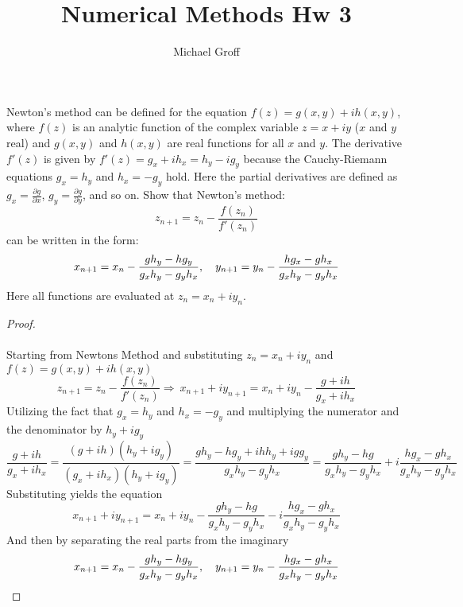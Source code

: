 \documentclass[12pt]{article}
\newenvironment{problem}[2][Problem]{\begin{trivlist}
\item[\hskip \labelsep {\bfseries #1}\hskip \labelsep {\bfseries #2.}]}{\end{trivlist}}
\begin{document}
\title{Numerical Methods Hw 3}
\author{Michael Groff 
}
\date{}
\maketitle

\begin{problem}{3.2: 40}
Newton’s method can be defined for the equation $f (z) = g(x, y)+ih(x, y)$, where $f (z)$ is an analytic function of the complex variable $z = x +iy$ ($x$ and $y$ real) and $g(x, y)$ and $h(x, y)$ are real functions for all $x$ and $y$. The derivative $f'(z)$ is given by $f'(z) = g_x +ih_x = h_y -ig_y$ because the Cauchy-Riemann equations $g_x = h_y$ and $h_x =− g_y$ hold. Here the partial derivatives are defined as $g_x = \frac{\partial g}{\partial x}$, $g_y = \frac{\partial g}{\partial y}$, and so on. Show that Newton’s method:
\[ z_{n+1} = z_n - \dfrac{f (z_n)}{ f'(z_n)}\] 
can be written in the form:
\[ x_{n+1} = x_n - \dfrac{gh_y -hg_y}{ g_xh_y -g_yh_x} , \text{  \space \space }y_{n+1} = y_n - \dfrac{hg_x -gh_x}{ g_xh_y -g_yh_x}\]
 Here all functions are evaluated at $z_n = x_n +iy_n$. 


\end{problem}

\begin{proof}
\text{ }\\
\text{ }\\
Starting from Newtons Method and substituting  $z_n = x_n +iy_n$ and $f (z) = g(x, y)+ih(x, y)$
\[ z_{n+1} = z_n − \dfrac{f (z_n)}{ f'(z_n)} \Rightarrow \ x_{n+1} + iy_{n+1} = x_n +iy_n-\dfrac{g+ih}{g_x+ih_x}\]
Utilizing the fact that  $g_x = h_y$ and $h_x =− g_y$ and multiplying the numerator and the denominator by $h_y +ig_y$
\[\dfrac{g+ih}{g_x+ih_x} = \dfrac{(g+ih)(h_y +ig_y)}{(g_x+ih_x)(h_y +ig_y)} = \dfrac{gh_y-hg_y+ihh_y+igg_y}{g_xh_y - g_yh_x} = \dfrac{gh_y-hg}{g_xh_y - g_yh_x} + i\dfrac{hg_x -gh_x}{g_xh_y - g_yh_x}\]
Substituting yields the equation
\[ x_{n+1} + iy_{n+1} = x_n +iy_n-\dfrac{gh_y-hg}{g_xh_y - g_yh_x} - i\dfrac{hg_x -gh_x}{g_xh_y - g_yh_x}\]
And then by separating the real parts from the imaginary
\[ x_{n+1} = x_n - \dfrac{gh_y -hg_y}{ g_xh_y -g_yh_x} , \text{  \space \space }y_{n+1} = y_n - \dfrac{hg_x -gh_x}{ g_xh_y -g_yh_x}\]





\end{proof}
\end{document}

